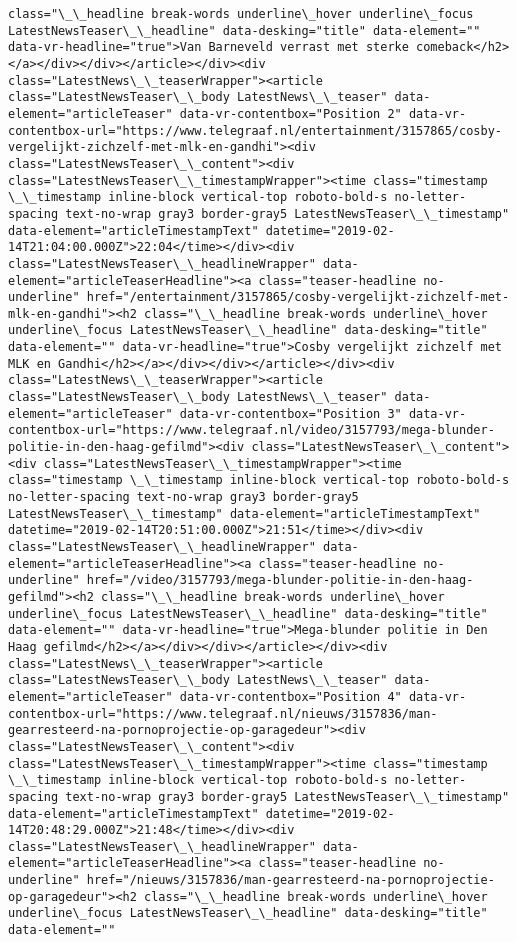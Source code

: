 \documentclass[11pt]{article}
\begin{document}
\begin{Verbatim}[commandchars=\\\{\}]
class="\_\_headline break-words underline\_hover underline\_focus LatestNewsTeaser\_\_headline" data-desking="title" data-element="" data-vr-headline="true">Van Barneveld verrast met sterke comeback</h2></a></div></div></article></div><div class="LatestNews\_\_teaserWrapper"><article class="LatestNewsTeaser\_\_body LatestNews\_\_teaser" data-element="articleTeaser" data-vr-contentbox="Position 2" data-vr-contentbox-url="https://www.telegraaf.nl/entertainment/3157865/cosby-vergelijkt-zichzelf-met-mlk-en-gandhi"><div class="LatestNewsTeaser\_\_content"><div class="LatestNewsTeaser\_\_timestampWrapper"><time class="timestamp \_\_timestamp inline-block vertical-top roboto-bold-s no-letter-spacing text-no-wrap gray3 border-gray5 LatestNewsTeaser\_\_timestamp" data-element="articleTimestampText" datetime="2019-02-14T21:04:00.000Z">22:04</time></div><div class="LatestNewsTeaser\_\_headlineWrapper" data-element="articleTeaserHeadline"><a class="teaser-headline no-underline" href="/entertainment/3157865/cosby-vergelijkt-zichzelf-met-mlk-en-gandhi"><h2 class="\_\_headline break-words underline\_hover underline\_focus LatestNewsTeaser\_\_headline" data-desking="title" data-element="" data-vr-headline="true">Cosby vergelijkt zichzelf met MLK en Gandhi</h2></a></div></div></article></div><div class="LatestNews\_\_teaserWrapper"><article class="LatestNewsTeaser\_\_body LatestNews\_\_teaser" data-element="articleTeaser" data-vr-contentbox="Position 3" data-vr-contentbox-url="https://www.telegraaf.nl/video/3157793/mega-blunder-politie-in-den-haag-gefilmd"><div class="LatestNewsTeaser\_\_content"><div class="LatestNewsTeaser\_\_timestampWrapper"><time class="timestamp \_\_timestamp inline-block vertical-top roboto-bold-s no-letter-spacing text-no-wrap gray3 border-gray5 LatestNewsTeaser\_\_timestamp" data-element="articleTimestampText" datetime="2019-02-14T20:51:00.000Z">21:51</time></div><div class="LatestNewsTeaser\_\_headlineWrapper" data-element="articleTeaserHeadline"><a class="teaser-headline no-underline" href="/video/3157793/mega-blunder-politie-in-den-haag-gefilmd"><h2 class="\_\_headline break-words underline\_hover underline\_focus LatestNewsTeaser\_\_headline" data-desking="title" data-element="" data-vr-headline="true">Mega-blunder politie in Den Haag gefilmd</h2></a></div></div></article></div><div class="LatestNews\_\_teaserWrapper"><article class="LatestNewsTeaser\_\_body LatestNews\_\_teaser" data-element="articleTeaser" data-vr-contentbox="Position 4" data-vr-contentbox-url="https://www.telegraaf.nl/nieuws/3157836/man-gearresteerd-na-pornoprojectie-op-garagedeur"><div class="LatestNewsTeaser\_\_content"><div class="LatestNewsTeaser\_\_timestampWrapper"><time class="timestamp \_\_timestamp inline-block vertical-top roboto-bold-s no-letter-spacing text-no-wrap gray3 border-gray5 LatestNewsTeaser\_\_timestamp" data-element="articleTimestampText" datetime="2019-02-14T20:48:29.000Z">21:48</time></div><div class="LatestNewsTeaser\_\_headlineWrapper" data-element="articleTeaserHeadline"><a class="teaser-headline no-underline" href="/nieuws/3157836/man-gearresteerd-na-pornoprojectie-op-garagedeur"><h2 class="\_\_headline break-words underline\_hover underline\_focus LatestNewsTeaser\_\_headline" data-desking="title" data-element="" 
\end{Verbatim}
\end{document}

